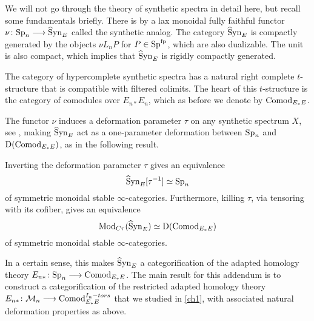 We will not go through the theory of synthetic spectra in detail here, but recall some fundamentals briefly. There is by \citeme a lax monoidal fully faithful functor $\nu\colon\mathrm{Sp}_n \longrightarrow \widehat{\mathrm{S}}\mathrm{yn}_{E}$ called the synthetic analog. The category $\widehat{\mathrm{S}}\mathrm{yn}_{E}$ is compactly generated by the objects $\nu L_n P$ for $P\in \mathrm{Sp}^{\mathrm{fp}}$, which are also dualizable. The unit is also compact, which implies that $\widehat{\mathrm{S}}\mathrm{yn}_{E}$ is rigidly compactly generated. 

The category of hypercomplete synthetic spectra has a natural right complete $t$-structure that is compatible with filtered colimits. The heart of this $t$-structure is the category of comodules over $E_{n*}E_n$, which as before we denote by $\mathrm{Comod}_{E_*E}$. 

The functor $\nu$ induces a deformation parameter $\tau$ on any synthetic spectrum $X$, see \citeme, making $\widehat{\mathrm{S}}\mathrm{yn}_{E}$ act as a one-parameter deformation between $\mathrm{Sp}_n$ and $\mathrm{D}(\mathrm{Comod}_{E_*E})$, as in the following result. 

\begin{theorem}
    \label{ch3:add:thm:deformation-properties-of-syn}
    Inverting the deformation parameter $\tau$ gives an equivalence 
    \[\widehat{\mathrm{S}}\mathrm{yn}_{E}[\tau^{-1}]\simeq \mathrm{Sp}_n\]
    of symmetric monoidal stable $\infty$-categories. Furthermore, killing $\tau$, via tensoring with its cofiber, gives an equivalence 
    \[\mathrm{Mod}_{C\tau}(\widehat{\mathrm{S}}\mathrm{yn}_{E})\simeq \mathrm{D}(\mathrm{Comod}_{E_*E})\]
    of symmetric monoidal stable $\infty$-categories. 
\end{theorem}

In a certain sense, this makes $\widehat{\mathrm{S}}\mathrm{yn}_{E}$ a categorification of the adapted homology theory $E_{n*}\colon \mathrm{Sp}_n\longrightarrow \mathrm{Comod}_{E_*E}$. The main result for this addendum is to construct a categorification of the restricted adapted homology theory $E_{n*}\colon \mathcal{M}_{n} \longrightarrow \mathrm{Comod}_{E_*E}^{I_n-tors}$ that we studied in \cref{ch1}, with associated natural deformation properties as above. 



